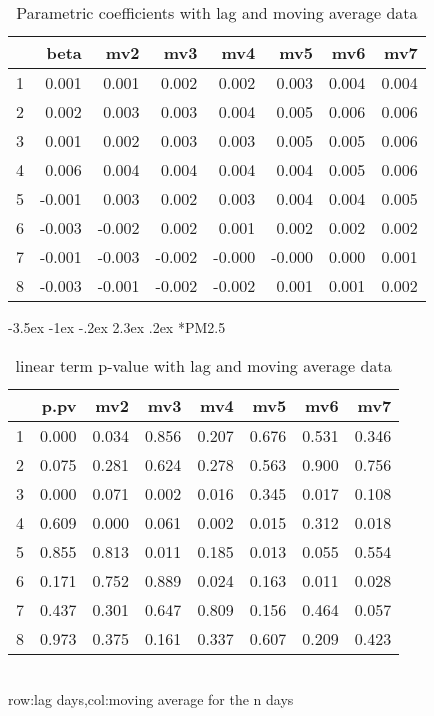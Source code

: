 \documentclass[a4paper, 12pt]{article}
\makeatletter
\def\large{\fontsize{14}{20}\selectfont}
\renewcommand\subsection{\@startsection {subsection}{1}{\z@}%
                                   {-3.5ex \@plus -1ex \@minus -.2ex}%
                                   {2.3ex \@plus.2ex}%
                                   {\centering\normalfont\large\bfseries}}
\makeatother
\begin{document}
\begin{table}[h]
\centering
\caption{Parametric coefficients with lag and moving average data}
\begin{tabular}{rrrrrrrr}
  \hline
 & beta & mv2 & mv3 & mv4 & mv5 & mv6 & mv7 \\
  \hline
1 & 0.001 & 0.001 & 0.002 & 0.002 & 0.003 & 0.004 & 0.004 \\
  2 & 0.002 & 0.003 & 0.003 & 0.004 & 0.005 & 0.006 & 0.006 \\
  3 & 0.001 & 0.002 & 0.003 & 0.003 & 0.005 & 0.005 & 0.006 \\
  4 & 0.006 & 0.004 & 0.004 & 0.004 & 0.004 & 0.005 & 0.006 \\
  5 & -0.001 & 0.003 & 0.002 & 0.003 & 0.004 & 0.004 & 0.005 \\
  6 & -0.003 & -0.002 & 0.002 & 0.001 & 0.002 & 0.002 & 0.002 \\
  7 & -0.001 & -0.003 & -0.002 & -0.000 & -0.000 & 0.000 & 0.001 \\
  8 & -0.003 & -0.001 & -0.002 & -0.002 & 0.001 & 0.001 & 0.002 \\
   \hline
\end{tabular}
\end{table}
\clearpage
\subsection*{PM2.5}
\begin{table}[h]
\centering
\caption{linear term p-value with lag and moving average data}
\begin{tabular}{rrrrrrrr}
  \hline
 & p.pv & mv2 & mv3 & mv4 & mv5 & mv6 & mv7 \\
  \hline
1 & 0.000 & 0.034 & 0.856 & 0.207 & 0.676 & 0.531 & 0.346 \\
  2 & 0.075 & 0.281 & 0.624 & 0.278 & 0.563 & 0.900 & 0.756 \\
  3 & 0.000 & 0.071 & 0.002 & 0.016 & 0.345 & 0.017 & 0.108 \\
  4 & 0.609 & 0.000 & 0.061 & 0.002 & 0.015 & 0.312 & 0.018 \\
  5 & 0.855 & 0.813 & 0.011 & 0.185 & 0.013 & 0.055 & 0.554 \\
  6 & 0.171 & 0.752 & 0.889 & 0.024 & 0.163 & 0.011 & 0.028 \\
  7 & 0.437 & 0.301 & 0.647 & 0.809 & 0.156 & 0.464 & 0.057 \\
  8 & 0.973 & 0.375 & 0.161 & 0.337 & 0.607 & 0.209 & 0.423 \\
   \hline
\end{tabular}
\\row:lag days,col:moving average for the n days
\end{table}
\end{document}
